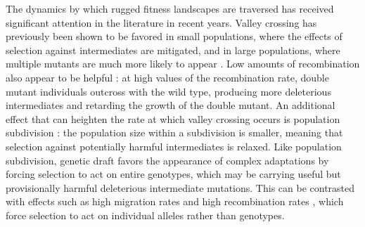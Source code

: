 \documentclass[rmp]{revtex4}
\begin{document}
\begin{spacing}{1.5}


The dynamics by which rugged fitness landscapes are traversed has received significant attention in the literature in recent years.
Valley crossing has previously been shown to be favored in small populations, where the effects of selection against intermediates are mitigated, and in large populations, where multiple mutants are much more likely to appear \citep{weissman_2009, ochs_2015}.
Low amounts of recombination also appear to be helpful \citep{weissman_2010}: at high values of the recombination rate, double mutant individuals outcross with the wild type, producing more deleterious intermediates and retarding the growth of the double mutant.
An additional effect that can heighten the rate at which valley crossing occurs is population subdivision \citep{Bitbol:Schwab:2014}: the population size within a subdivision is smaller, meaning that selection against potentially harmful intermediates is relaxed.
Like population subdivision, genetic draft favors the appearance of complex adaptations by forcing selection to act on entire genotypes, which may be carrying useful but provisionally harmful deleterious intermediate mutations.
This can be contrasted with effects such as high migration rates and high recombination rates \citep{neher_shraiman_2009}, which force selection to act on individual alleles rather than genotypes.


\end{spacing}
\end{document}
